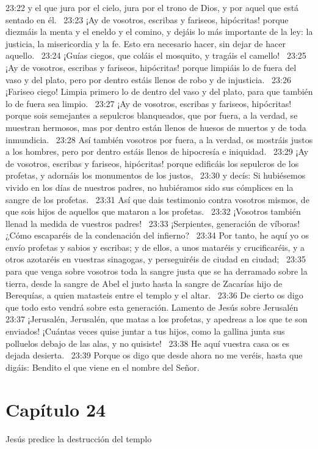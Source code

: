 23:22 y el que jura por el cielo, jura por el trono de Dios, y por aquel que está sentado en él.  
23:23 ¡Ay de vosotros, escribas y fariseos, hipócritas! porque diezmáis la menta y el eneldo y el comino, y dejáis lo más importante de la ley: la justicia, la misericordia y la fe. Esto era necesario hacer, sin dejar de hacer aquello.  
23:24 ¡Guías ciegos, que coláis el mosquito, y tragáis el camello!  
23:25 ¡Ay de vosotros, escribas y fariseos, hipócritas! porque limpiáis lo de fuera del vaso y del plato, pero por dentro estáis llenos de robo y de injusticia.  
23:26 ¡Fariseo ciego! Limpia primero lo de dentro del vaso y del plato, para que también lo de fuera sea limpio.  
23:27 ¡Ay de vosotros, escribas y fariseos, hipócritas! porque sois semejantes a sepulcros blanqueados, que por fuera, a la verdad, se muestran hermosos, mas por dentro están llenos de huesos de muertos y de toda inmundicia.  
23:28 Así también vosotros por fuera, a la verdad, os mostráis justos a los hombres, pero por dentro estáis llenos de hipocresía e iniquidad.  
23:29 ¡Ay de vosotros, escribas y fariseos, hipócritas! porque edificáis los sepulcros de los profetas, y adornáis los monumentos de los justos,  
23:30 y decís: Si hubiésemos vivido en los días de nuestros padres, no hubiéramos sido sus cómplices en la sangre de los profetas.  
23:31 Así que dais testimonio contra vosotros mismos, de que sois hijos de aquellos que mataron a los profetas.  
23:32 ¡Vosotros también llenad la medida de vuestros padres!  
23:33 ¡Serpientes, generación de víboras! ¿Cómo escaparéis de la condenación del infierno?  
23:34 Por tanto, he aquí yo os envío profetas y sabios y escribas; y de ellos, a unos mataréis y crucificaréis, y a otros azotaréis en vuestras sinagogas, y perseguiréis de ciudad en ciudad;  
23:35 para que venga sobre vosotros toda la sangre justa que se ha derramado sobre la tierra, desde la sangre de Abel el justo hasta la sangre de Zacarías hijo de Berequías, a quien matasteis entre el templo y el altar.  
23:36 De cierto os digo que todo esto vendrá sobre esta generación. 
Lamento de Jesús sobre Jerusalén  
23:37 ¡Jerusalén, Jerusalén, que matas a los profetas, y apedreas a los que te son enviados! ¡Cuántas veces quise juntar a tus hijos, como la gallina junta sus polluelos debajo de las alas, y no quisiste!  
23:38 He aquí vuestra casa os es dejada desierta.  
23:39 Porque os digo que desde ahora no me veréis, hasta que digáis: Bendito el que viene en el nombre del Señor. 
\section*{Capítulo 24}
Jesús predice la destrucción del templo   

